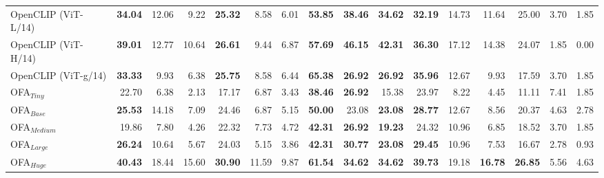 \begin{table}[ht]
\begin{adjustbox}{max width=\textwidth}
\begin{tabular}{l|rrr|rrr|rrr|rrr|rrr}
 OpenCLIP (ViT-L/14)            & \textbf{34.04} & 12.06          & 9.22           & \textbf{25.32} & 8.58           & 6.01           & \textbf{53.85} & \textbf{38.46} & \textbf{34.62} & \textbf{32.19} & 14.73          & 11.64          & 25.00          & 3.70           & 1.85           \\
 OpenCLIP (ViT-H/14)            & \textbf{39.01} & 12.77          & 10.64          & \textbf{26.61} & 9.44           & 6.87           & \textbf{57.69} & \textbf{46.15} & \textbf{42.31} & \textbf{36.30} & 17.12          & 14.38          & 24.07          & 1.85           & 0.00           \\
 OpenCLIP (ViT-g/14)            & \textbf{33.33} & 9.93           & 6.38           & \textbf{25.75} & 8.58           & 6.44           & \textbf{65.38} & \textbf{26.92} & \textbf{26.92} & \textbf{35.96} & 12.67          & 9.93           & 17.59          & 3.70           & 1.85           \\
 OFA$_{Tiny}$                        & 22.70          & 6.38           & 2.13           & 17.17          & 6.87           & 3.43           & \textbf{38.46} & \textbf{26.92} & 15.38          & 23.97          & 8.22           & 4.45           & 11.11          & 7.41           & 1.85           \\
 OFA$_{Base}$                        & \textbf{25.53} & 14.18          & 7.09           & 24.46          & 6.87           & 5.15           & \textbf{50.00} & 23.08          & \textbf{23.08} & \textbf{28.77} & 12.67          & 8.56           & 20.37          & 4.63           & 2.78           \\
 OFA$_{Medium}$                      & 19.86          & 7.80           & 4.26           & 22.32          & 7.73           & 4.72           & \textbf{42.31} & \textbf{26.92} & \textbf{19.23} & 24.32          & 10.96          & 6.85           & 18.52          & 3.70           & 1.85           \\
 OFA$_{Large}$                       & \textbf{26.24} & 10.64          & 5.67           & 24.03          & 5.15           & 3.86           & \textbf{42.31} & \textbf{30.77} & \textbf{23.08} & \textbf{29.45} & 10.96          & 7.53           & 16.67          & 2.78           & 0.93           \\
 OFA$_{Huge}$                        & \textbf{40.43} & 18.44          & 15.60          & \textbf{30.90} & 11.59          & 9.87           & \textbf{61.54} & \textbf{34.62} & \textbf{34.62} & \textbf{39.73} & 19.18          & \textbf{16.78} & \textbf{26.85} & 5.56           & 4.63           \\

\end{tabular}
\end{adjustbox}
\end{table}

